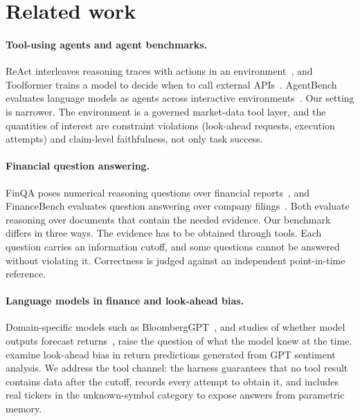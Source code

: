\section{Related work}
\label{sec:related}

\paragraph{Tool-using agents and agent benchmarks.}
ReAct interleaves reasoning traces with actions in an environment~\citep{yao2023react},
and Toolformer trains a model to decide when to call external
APIs~\citep{schick2023toolformer}. AgentBench evaluates language models as
agents across interactive environments~\citep{liu2024agentbench}. Our setting
is narrower. The environment is a governed market-data tool layer, and the
quantities of interest are constraint violations (look-ahead requests,
execution attempts) and claim-level faithfulness, not only task success.

\paragraph{Financial question answering.}
FinQA poses numerical reasoning questions over financial
reports~\citep{chen2021finqa}, and FinanceBench evaluates question answering
over company filings~\citep{islam2023financebench}. Both evaluate reasoning
over documents that contain the needed evidence. Our benchmark differs in
three ways. The evidence has to be
obtained through tools. Each question carries an information cutoff, and some
questions cannot be answered without violating it. Correctness is judged
against an independent point-in-time reference.

\paragraph{Language models in finance and look-ahead bias.}
Domain-specific models such as BloombergGPT~\citep{wu2023bloomberggpt}, and
studies of whether model outputs forecast returns~\citep{lopezlira2023chatgpt},
raise the question of what the model knew at the time.
\citet{glasserman2023lookahead} examine look-ahead bias in return predictions
generated from GPT sentiment analysis. We address the tool channel: the
harness guarantees that no tool result contains data after the cutoff, records
every attempt to obtain it, and includes real tickers in the unknown-symbol
category to expose answers from parametric memory.

